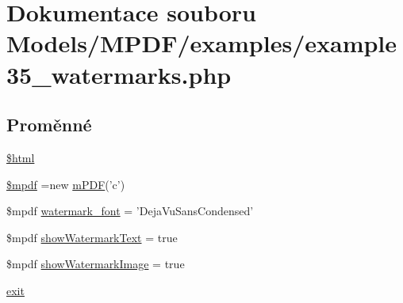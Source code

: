 \hypertarget{example35__watermarks_8php}{\section{Dokumentace souboru Models/\-M\-P\-D\-F/examples/example35\-\_\-watermarks.php}
\label{example35__watermarks_8php}
}
\subsection*{Proměnné}
\begin{DoxyCompactItemize}
\item 
\hyperlink{example35__watermarks_8php_a6f96e7fc92441776c9d1cd3386663b40}{\$html}
\item 
\hyperlink{example35__watermarks_8php_ad028f81910d6cbab9b184d2214b3a8f8}{\$mpdf} =new \hyperlink{classm_p_d_f}{m\-P\-D\-F}('c')
\item 
\$mpdf \hyperlink{example35__watermarks_8php_a426580df42bc34f59a4fc5f8c28b717e}{watermark\-\_\-font} = 'Deja\-Vu\-Sans\-Condensed'
\item 
\$mpdf \hyperlink{example35__watermarks_8php_a9ab1c703a48a898b01dfcdf379ed52ce}{show\-Watermark\-Text} = true
\item 
\$mpdf \hyperlink{example35__watermarks_8php_a8fd349b8999c8096db1ed510167be7ee}{show\-Watermark\-Image} = true
\item 
\hyperlink{example35__watermarks_8php_a6733eb5f605d09eaede9845835d71c4e}{exit}
\end{DoxyCompactItemize}



